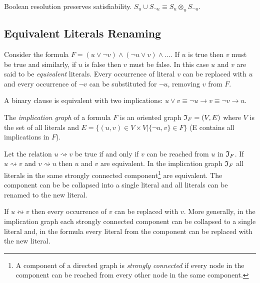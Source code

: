 \begin{myprop}
  Boolean resolution preserves satisfiability. $S_u \cup S_{\neg u}
  \equiv S_u \otimes_{u} S_{\neg u}$.
\end{myprop}

\subsection{Equivalent Literals Renaming}
\label{ssec:eqlr}

Consider the formula $F = (u \lor \neg v) \land (\neg u \lor v) \land \ldots$.
If $u$ is true then $v$ must be true and similarly, if $u$ is false
then $v$ must be false. In this case $u$ and $v$ are said to be
\emph{equivalent} literals. Every occurrence of literal $v$ can be
replaced with $u$ and every occurrence of $\neg v$ can be
substituted for $\neg u$, removing $v$ from $F$.

\begin{myprop}
  A binary clause is equivalent with two implications:
  $u \lor v \equiv \neg u \rightarrow v \equiv \neg v \rightarrow u$.
\end{myprop}

\begin{mydef}
  The \emph{implication graph} of a formula $F$ is an oriented graph
  $\mathfrak{I}_F = (V, E)$ where $V$ is the set of all literals and $E = \{(u,
  v) \in V \times V | \{\neg u, v\} \in F\}$ (E contains all implications in $F$).
\end{mydef}

Let the relation $u \rightsquigarrow v$ be true if and only if
$v$ can be reached from $u$ in $\mathfrak{I}_F$.  If $u \rightsquigarrow v$
and $v \rightsquigarrow u$ then $u$ and $v$ are equivalent.  In the
implication graph $\mathfrak{I}_F$ all literals in the same strongly connected
component\footnote{A component of a directed graph is \emph{strongly
connected} if every node in the component can be reached from every
other node in the same component.} are equivalent. The component
can be be collapsed into a single literal and all literals can be
renamed to the new literal.

\begin{myprop}
  If $u \leftrightsquigarrow v$ then every occurrence of $v$ can be replaced
  with $v$. More generally, in the implication graph each strongly
  connected component can be collapsed to a single literal and, in
  the formula every literal from the component can be replaced with
  the new literal.
\end{myprop}


